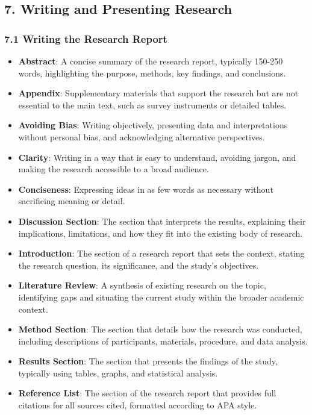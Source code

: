 \documentclass[
]{book}
\providecommand{\tightlist}{%
  \setlength{\itemsep}{0pt}\setlength{\parskip}{0pt}}
\begin{document}
\subsection*{\texorpdfstring{7. \textbf{Writing and Presenting Research}}{7. Writing and Presenting Research}}\label{writing-and-presenting-research}

\subsubsection*{\texorpdfstring{\textbf{7.1 Writing the Research Report}}{7.1 Writing the Research Report}}\label{writing-the-research-report}

\begin{itemize}
\tightlist
\item
  \textbf{Abstract}: A concise summary of the research report, typically 150-250 words, highlighting the purpose, methods, key findings, and conclusions.
\item
  \textbf{Appendix}: Supplementary materials that support the research but are not essential to the main text, such as survey instruments or detailed tables.
\item
  \textbf{Avoiding Bias}: Writing objectively, presenting data and interpretations without personal bias, and acknowledging alternative perspectives.
\item
  \textbf{Clarity}: Writing in a way that is easy to understand, avoiding jargon, and making the research accessible to a broad audience.
\item
  \textbf{Conciseness}: Expressing ideas in as few words as necessary without sacrificing meaning or detail.
\item
  \textbf{Discussion Section}: The section that interprets the results, explaining their implications, limitations, and how they fit into the existing body of research.
\item
  \textbf{Introduction}: The section of a research report that sets the context, stating the research question, its significance, and the study's objectives.
\item
  \textbf{Literature Review}: A synthesis of existing research on the topic, identifying gaps and situating the current study within the broader academic context.
\item
  \textbf{Method Section}: The section that details how the research was conducted, including descriptions of participants, materials, procedure, and data analysis.
\item
  \textbf{Results Section}: The section that presents the findings of the study, typically using tables, graphs, and statistical analysis.
\item
  \textbf{Reference List}: The section of the research report that provides full citations for all sources cited, formatted according to APA style.
\end{itemize}
\end{document}

